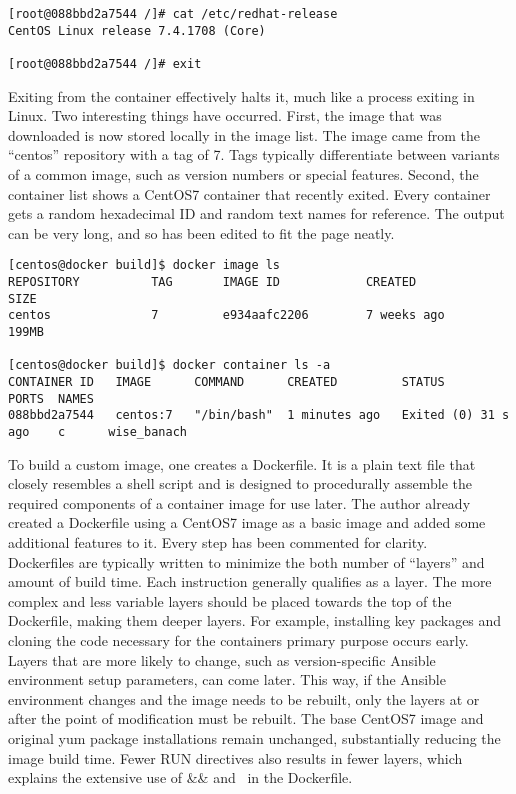 \begin{verbatim}
[root@088bbd2a7544 /]# cat /etc/redhat-release 
CentOS Linux release 7.4.1708 (Core) 

[root@088bbd2a7544 /]# exit
\end{verbatim}

Exiting from the container effectively halts it, much like a process exiting
in Linux. Two interesting things have occurred. First, the image that was
downloaded is now stored locally in the image list. The image came from the
``centos'' repository with a tag of 7. Tags typically differentiate between
variants of a common image, such as version numbers or special features.
Second, the container list shows a CentOS7 container that recently exited.
Every container gets a random hexadecimal ID and random text names for
reference. The output can be very long, and so has been edited to fit the page
neatly.
 
\begin{verbatim}
[centos@docker build]$ docker image ls
REPOSITORY          TAG       IMAGE ID            CREATED             SIZE
centos              7         e934aafc2206        7 weeks ago         199MB

[centos@docker build]$ docker container ls -a
CONTAINER ID   IMAGE      COMMAND      CREATED         STATUS                 PORTS  NAMES
088bbd2a7544   centos:7   "/bin/bash"  1 minutes ago   Exited (0) 31 s ago    c      wise_banach
\end{verbatim}

To build a custom image, one creates a Dockerfile. It is a plain text file
that closely resembles a shell script and is designed to procedurally assemble
the required components of a container image for use later. The author already
created a Dockerfile using a CentOS7 image as a basic image and added some
additional features to it. Every step has been commented for clarity. \\

Dockerfiles are typically written to minimize the both number of ``layers'' and
amount of build time. Each instruction generally qualifies as a layer. The
more complex and less variable layers should be placed towards the top of the
Dockerfile, making them deeper layers. For example, installing key packages
and cloning the code necessary for the containers primary purpose occurs
early. Layers that are more likely to change, such as version-specific Ansible
environment setup parameters, can come later. This way, if the Ansible
environment changes and the image needs to be rebuilt, only the layers at or
after the point of modification must be rebuilt. The base CentOS7 image and
original yum package installations remain unchanged, substantially reducing
the image build time. Fewer RUN directives also results in fewer layers, which
explains the extensive use of \&\& and \ in the Dockerfile.

